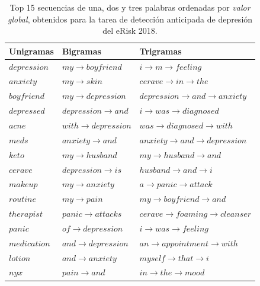 \begin{table}[t]
\centering
\caption{Top 15 secuencias de una, dos y tres palabras ordenadas por \emph{valor global}, obtenidos para la tarea de detección anticipada de depresión del eRisk 2018.}
\label{tab:ngramas}
\begin{tabular}{l | l | l}
\hline
Unigramas & Bigramas & Trigramas \\ \hline
$depression$ & $my{\rightarrow}boyfriend$ & $i{\rightarrow}m{\rightarrow}feeling$ \\
$anxiety$ & $my{\rightarrow}skin$ & $cerave{\rightarrow}in{\rightarrow}the$ \\
$boyfriend$ & $my{\rightarrow}depression$ & $depression{\rightarrow}and{\rightarrow}anxiety$ \\
$depressed$ & $depression{\rightarrow}and$ & $i{\rightarrow}was{\rightarrow}diagnosed$ \\
$acne$ & $with{\rightarrow}depression$ & $was{\rightarrow}diagnosed{\rightarrow}with$ \\
$meds$ & $anxiety{\rightarrow}and$ & $anxiety{\rightarrow}and{\rightarrow}depression$ \\
$keto$ & $my{\rightarrow}husband$ & $my{\rightarrow}husband{\rightarrow}and$ \\
$cerave$ & $depression{\rightarrow}is$ & $husband{\rightarrow}and{\rightarrow}i$ \\
$makeup$ & $my{\rightarrow}anxiety$ & $a{\rightarrow}panic{\rightarrow}attack$ \\
$routine$ & $my{\rightarrow}pain$ & $my{\rightarrow}boyfriend{\rightarrow}and$ \\
$therapist$ & $panic{\rightarrow}attacks$ & $cerave{\rightarrow}foaming{\rightarrow}cleanser$ \\
$panic$ & $of{\rightarrow}depression$ & $i{\rightarrow}was{\rightarrow}feeling$ \\
$medication$ & $and{\rightarrow}depression$ & $an{\rightarrow}appointment{\rightarrow}with$ \\
$lotion$ & $and{\rightarrow}anxiety$ & $myself{\rightarrow}that{\rightarrow}i$ \\
$nyx$ & $pain{\rightarrow}and$ & $in{\rightarrow}the{\rightarrow}mood$ \\
\hline
\end{tabular}
\end{table}

